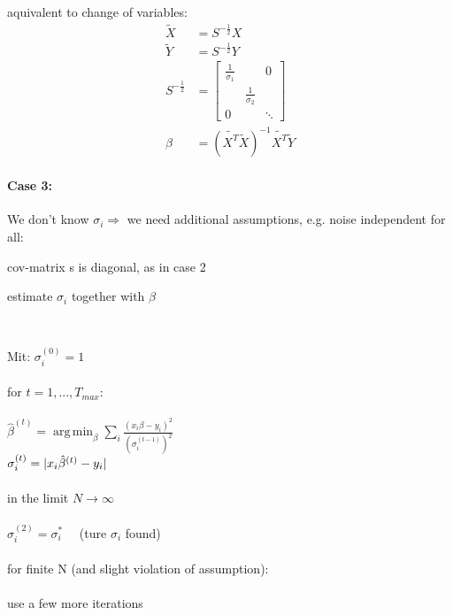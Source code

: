 \documentclass[11pt]{article}
\DeclareMathOperator*{\argmin}{arg\,min}
\DeclarePairedDelimiter\abs{\lvert}{\rvert}
\begin{document}
      aquivalent to change of variables:
      \begin{equation*}
        \begin{align*}
          \tilde{X} &= S^{-\frac{1}{2}}X \\
          \tilde{Y} &= S^{-\frac{1}{2}}Y \\
          S^{-\frac{1}{2}} &= \left[
          \begin{array}{ccc}
            \frac{1}{\sigma_1} & & 0 \\
            & \frac{1}{\sigma_2} & \\
            0 & & \ddots
          \end{array}
          \right] \\
          \beta &= (\tilde{X^T}\tilde{X})^{-1}\tilde{X^T}\tilde{Y}
        \end{align*}
      \end{equation*}
      \paragraph{Case 3:} We don't know $\sigma_i \Rightarrow$ we need additional
      assumptions, e.g. noise independent for all:
      \begin{arrowlist}
        \item cov-matrix s is diagonal, as in case 2
        \item estimate $\sigma_i$ together with $\beta$
        \item {} \\
        \end{arrowlist}
      Mit: $\sigma_i^{(0)} = 1$ \\ \\
      for $t=1,...,T_{max}$: \\ \\
      \-\hspace{1cm} $\hat{\beta}^{(t)} = \argmin_{\beta} \sum_i
      \frac{(x_i\beta-y_i)^2}{(\sigma_i^{(t-1)})^2}$    \\
      \-\hspace{1cm} $\sigma_i^{(t)} = \abs{x_i\hat{\beta}^{(t)}-y_i}$ \\ \\
      in the limit $N \to \infty$ \\ \\
      \-\hspace{1cm} $\sigma_i^{(2)} = \sigma_i^* \quad$ (ture $\sigma_i$ found) \\ \\
      for finite N (and slight violation of assumption): \\ \\
      \-\hspace{1cm} use a few more iterations
\end{document}

